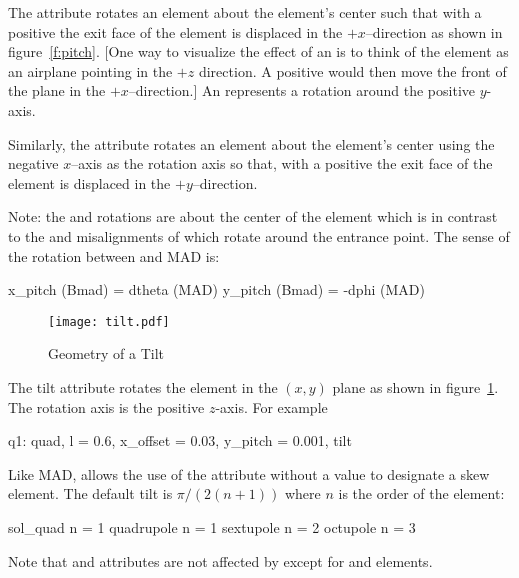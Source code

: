 The  attribute rotates an element about the element's center such that with a positive
 the exit face of the element is displaced in the $+x$--direction as shown in
figure~\ref{f:pitch}. [One way to visualize the effect of an  is to think of the element
as an airplane pointing in the $+z$ direction. A positive  would then move the front of
the plane in the $+x$--direction.] An represents a rotation around the positive
$y$-axis.

Similarly, the  attribute rotates an element about the element's center using the
negative $x$--axis as the rotation axis so that, with a positive  the exit face of the
element is displaced in the $+y$--direction.

Note: the  and  rotations are about the center of the element which is in contrast
to the  and  misalignments of \mad which rotate around the entrance point. The
sense of the rotation between \bmad and MAD is:
\begin{example}
  x_pitch (Bmad) =  dtheta (MAD)
  y_pitch (Bmad) = -dphi (MAD)
\end{example}

\begin{figure}[tb]
  \centering
  \texttt{[image: tilt.pdf]}
  \caption{Geometry of a Tilt}
  \label{f:tilt}
\end{figure}

The tilt attribute rotates the element in the $(x, y)$ plane as shown in figure~\ref{f:tilt}. The
rotation axis is the positive $z$-axis. For example
\begin{example}
  q1: quad, l = 0.6, x_offset = 0.03, y_pitch = 0.001, tilt
\end{example}
Like MAD, \bmad allows the use of the  attribute without a value to designate a skew
element. The default tilt is $\pi/(2(n+1))$ where $n$ is the order of the element:
\begin{example}
  sol_quad       n = 1
  quadrupole     n = 1
  sextupole      n = 2
  octupole       n = 3
\end{example}

Note that  and  attributes are not affected by  except for 
and  elements.

